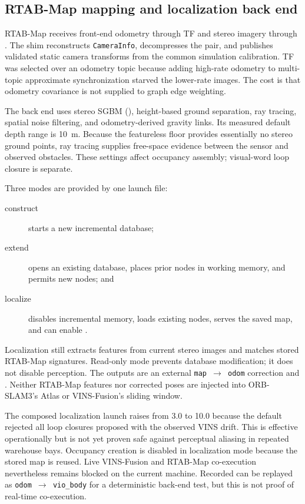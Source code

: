 \subsection{RTAB-Map mapping and localization back end}

RTAB-Map receives front-end odometry through TF and stereo imagery through
. The shim reconstructs \texttt{CameraInfo}, decompresses
the pair, and publishes validated static camera transforms from the common
simulation calibration. TF was selected over an odometry topic because adding
high-rate odometry to multi-topic approximate synchronization starved the
lower-rate images. The cost is that odometry covariance is not supplied to graph
edge weighting.

The back end uses stereo SGBM (), height-based
ground separation, ray tracing, spatial noise filtering, and odometry-derived
gravity links. Its measured default depth range is \SI{10}{\metre}. Because the
featureless floor provides essentially no stereo ground points, ray tracing
supplies free-space evidence between the sensor and observed obstacles. These
settings affect occupancy assembly; visual-word loop closure is separate.

Three modes are provided by one launch file:
\begin{description}
  \item[construct] starts a new incremental database;
  \item[extend] opens an existing database, places prior nodes in working memory,
    and permits new nodes; and
  \item[localize] disables incremental memory, loads existing nodes, serves the
    saved map, and can enable .
\end{description}

Localization still extracts features from current stereo images and matches
stored RTAB-Map signatures. Read-only mode prevents database modification; it
does not disable perception. The outputs are an external
\texttt{map~$\rightarrow$~odom} correction and . Neither
RTAB-Map features nor corrected poses are injected into ORB-SLAM3's Atlas or
VINS-Fusion's sliding window.

The composed localization launch raises  from 3.0 to
10.0 because the default rejected all loop closures proposed with the observed
VINS drift. This is effective operationally but is not yet proven safe against
perceptual aliasing in repeated warehouse bays. Occupancy creation is disabled in
localization mode because the stored map is reused. Live VINS-Fusion and RTAB-Map
co-execution nevertheless remains blocked on the current machine. Recorded
 can be replayed as \texttt{odom~$\rightarrow$~vio\_body} for a
deterministic back-end test, but this is not proof of real-time co-execution.

